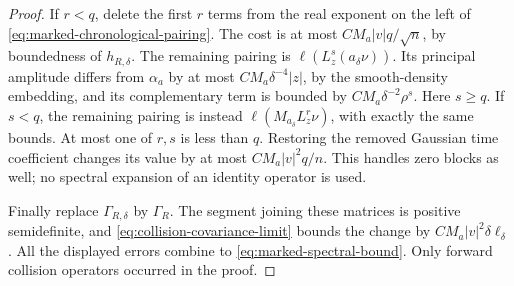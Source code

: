 \begin{proof}
If $r<q$, delete the first $r$ terms from the real exponent on the left
of \eqref{eq:marked-chronological-pairing}. The cost is at most
$C M_a|v|q/\sqrt n$, by boundedness of $h_{R,\delta}$. The remaining
pairing is $\ell(L_z^s(a_\delta\nu))$. Its principal amplitude differs
from $\alpha_a$ by at most $C M_a\delta^{-4}|z|$, by the smooth-density
embedding, and its complementary term is bounded by
$C M_a\delta^{-2}\rho^s$. Here $s\ge q$. If $s<q$, the remaining
pairing is instead $\ell(M_{a_\delta}L_z^r\nu)$, with exactly the same
bounds. At most one of $r,s$ is less than $q$. Restoring the removed
Gaussian time coefficient changes its value by at most
$C M_a|v|^2q/n$. This handles zero blocks as well; no spectral expansion
of an identity operator is used.

Finally replace $\Gamma_{R,\delta}$ by $\Gamma_R$. The segment joining
these matrices is positive semidefinite, and
\eqref{eq:collision-covariance-limit} bounds the change by
$C M_a|v|^2\delta\ell_\delta$. All the displayed errors combine to
\eqref{eq:marked-spectral-bound}. Only forward collision operators
occurred in the proof.
\end{proof}

